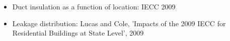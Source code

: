 \begin{itemize}
\item Duct insulation as a function of location: IECC 2009
\item Leakage distribution: Lucas and Cole, 'Impacts of the 2009 IECC for Residential Buildings at State Level', 2009
\end{itemize}
